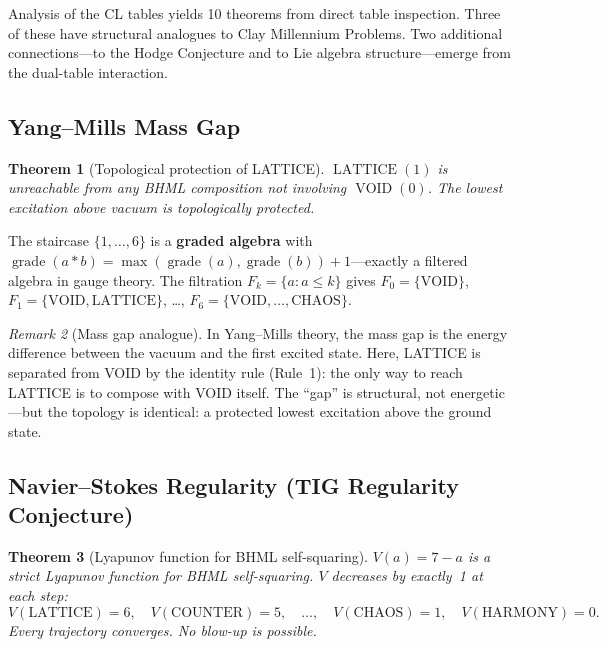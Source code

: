 \documentclass[11pt]{article}
\newtheorem{theorem}{Theorem}[section]
\theoremstyle{definition}
\theoremstyle{remark}
\newtheorem{remark}[theorem]{Remark}
\begin{document}
Analysis of the CL tables yields 10 theorems from direct table inspection.
Three of these have structural analogues to Clay Millennium Problems.  Two
additional connections---to the Hodge Conjecture and to Lie algebra
structure---emerge from the dual-table interaction.

\subsection{Yang--Mills Mass Gap}
\label{sec:yang-mills-analogue}

\begin{theorem}[Topological protection of LATTICE]
\label{thm:lattice-gap}
$\operatorname{LATTICE}(1)$ is unreachable from any BHML composition not
involving $\operatorname{VOID}(0)$.  The lowest excitation above vacuum is
topologically protected.
\end{theorem}

The staircase $\{1, \ldots, 6\}$ is a \textbf{graded algebra} with
$\operatorname{grade}(a \ast b) = \max(\operatorname{grade}(a),
\operatorname{grade}(b)) + 1$---exactly a filtered algebra in gauge theory.
The filtration $F_k = \{a : a \le k\}$ gives $F_0 = \{\text{VOID}\}$,
$F_1 = \{\text{VOID}, \text{LATTICE}\}$, \ldots,
$F_6 = \{\text{VOID}, \ldots, \text{CHAOS}\}$.

\begin{remark}[Mass gap analogue]
In Yang--Mills theory, the mass gap is the energy difference between the vacuum
and the first excited state.  Here, LATTICE is separated from VOID by the
identity rule (Rule~1): the only way to reach LATTICE is to compose with VOID
itself.  The ``gap'' is structural, not energetic---but the topology is
identical: a protected lowest excitation above the ground state.
\end{remark}

\subsection{Navier--Stokes Regularity (TIG Regularity Conjecture)}
\label{sec:ns-analogue}

\begin{theorem}[Lyapunov function for BHML self-squaring]
\label{thm:lyapunov}
$V(a) = 7 - a$ is a strict Lyapunov function for BHML self-squaring.  $V$
decreases by exactly~1 at each step:
\[
  V(\text{LATTICE}) = 6, \quad
  V(\text{COUNTER}) = 5, \quad
  \ldots, \quad
  V(\text{CHAOS}) = 1, \quad
  V(\text{HARMONY}) = 0.
\]
Every trajectory converges.  No blow-up is possible.
\end{theorem}
\end{document}
